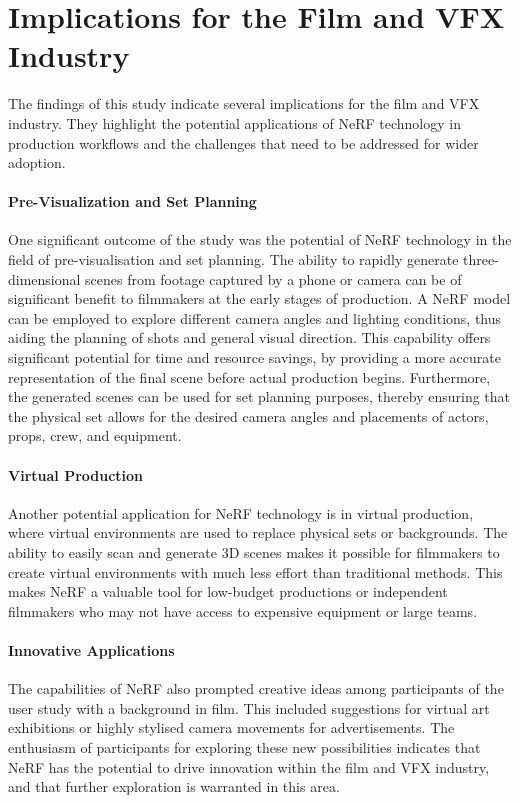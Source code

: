 \section{Implications for the Film and VFX Industry}
\label{sec:discussion:implications}

The findings of this study indicate several implications for the film and VFX industry. 
They highlight the potential applications of NeRF technology in production workflows and the challenges that need to be addressed for wider adoption.

\paragraph{Pre-Visualization and Set Planning}
One significant outcome of the study was the potential of NeRF technology in the field of pre-visualisation and set planning.
The ability to rapidly generate three-dimensional scenes from footage captured by a phone or camera can be of significant benefit to filmmakers at the early stages of production.
A NeRF model can be employed to explore different camera angles and lighting conditions, thus aiding the planning of shots and general visual direction.
This capability offers significant potential for time and resource savings, by providing a more accurate representation of the final scene before actual production begins.
Furthermore, the generated scenes can be used for set planning purposes, thereby ensuring that the physical set allows for the desired camera angles and placements of actors, props, crew, and equipment.

\paragraph{Virtual Production}
Another potential application for NeRF technology is in virtual production, where virtual environments are used to replace physical sets or backgrounds.
The ability to easily scan and generate 3D scenes makes it possible for filmmakers to create virtual environments with much less effort than traditional methods.
This makes NeRF a valuable tool for low-budget productions or independent filmmakers who may not have access to expensive equipment or large teams.

\paragraph{Innovative Applications}
The capabilities of NeRF also prompted creative ideas among participants of the user study with a background in film.
This included suggestions for virtual art exhibitions or highly stylised camera movements for advertisements.
The enthusiasm of participants for exploring these new possibilities indicates that NeRF has the potential to drive innovation within the film and VFX industry, and that further exploration is warranted in this area.  

